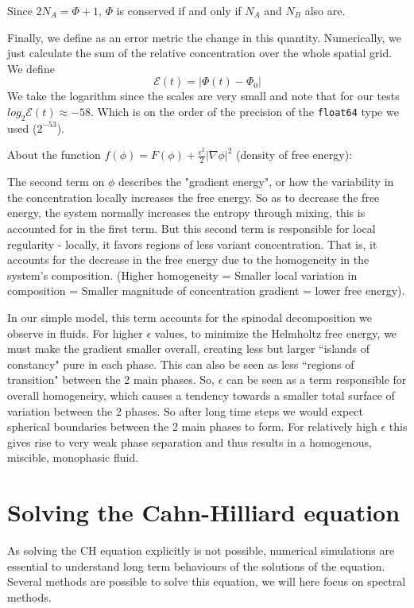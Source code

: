 \documentclass{article}
\begin{document}
Since $2N_A = \Phi+1$, $\Phi$ is conserved if and only if $N_A$ and $N_B$ also are.

Finally, we define as an error metric the change in this quantity.
Numerically, we just calculate the sum of the relative concentration over the whole spatial grid.
We define
\[ \mathcal{E}(t) = |\Phi(t) - \Phi_0| \]
We take the logarithm since the scales are very small and note that for our tests $log_{2}\mathcal{E}(t) \approx -58$.
Which is on the order of the precision of the \verb`float64` type we used ($2^{-53}$).

About the function $f(\phi) = F(\phi) + \frac{\epsilon^2}{2}|\nabla{\phi}|^2$ (density of free energy):

The second term on $\phi$ describes the "gradient energy", or how the variability in the concentration locally increases the free energy.
So as to decrease the free energy, the system normally increases the entropy through mixing, this is accounted for in the first term.
But this second term is responsible for local regularity - locally, it favors regions of less variant concentration.
That is, it accounts for the decrease in the free energy due to the homogeneity in the system's composition.
(Higher homogeneity = Smaller local variation in composition = Smaller magnitude of concentration gradient = lower free energy).

In our simple model, this term accounts for the spinodal decomposition we observe in fluids.
For higher $\epsilon$ values, to minimize the Helmholtz free energy, we must make the gradient smaller overall, creating less but larger ``islands of constancy" pure in each phase.
This can also be seen as less ``regions of transition" between the 2 main phases.
So, $\epsilon$ can be seen as a term responsible for overall homogeneiry, which causes a tendency towards a smaller total surface of variation between the 2 phases.
So after long time steps we would expect spherical boundaries between the 2 main phases to form.
For relatively high $\epsilon$ this gives rise to very weak phase separation and thus results in a homogenous, miscible, monophasic fluid.


\section{Solving the Cahn-Hilliard equation}

As solving the CH equation explicitly is not possible, numerical simulations are essential to understand long term behaviours of the solutions of the equation. Several methods are possible to solve this equation, we will here focus on spectral methods. 
\end{document}
